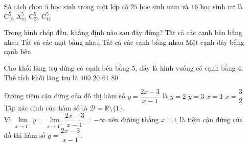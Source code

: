 \begin{ex}%
	Số cách chọn $5$ học sinh trong một lớp có $25$ học sinh nam và $16$ học sinh nữ là
	\choice
	 {$\mathrm{C}_{16}^{5}$}
	 {$\mathrm{A}_{41}^{5}$}
	 {$\mathrm{C}_{25}^{5}$}
	 {\True $\mathrm{C}_{41}^{5}$}
\end{ex}


\begin{ex}%
	Trong hình chóp đều, khẳng định nào sau đây đúng?
	\choice
	 {\True Tất cả các cạnh bên bằng nhau}
	 {Tất cả các mặt bằng nhau}
	 {Tất cả các cạnh bằng nhau}
	 {Một cạnh đáy bằng cạnh bên}
\end{ex}


\begin{ex}%
	Cho khối lăng trụ đứng có cạnh bên bằng $5$, đáy là hình vuông có cạnh bằng $4.$ Thể tích khối lăng trụ là
	\choice
	 {$100$}
	 {$20$}
	 {$64$}
	 {\True $80$}
\end{ex}



\begin{ex}%
	Đường tiệm cận đứng của đồ thị hàm số $y=\dfrac{2x-3}{x-1}$ là
	\choice
	{$y=2$}
	{$y=3$}
	{\True $x=1$}
	{$x=\dfrac{3}{2}$}
	\loigiai
	{
		Tập xác định của hàm số là $\mathscr{D}=\mathbb{R}\setminus \{1\}$.\\
		Vì $\lim\limits_{x\to 1^+}y= \lim\limits_{x\to 1^+}\dfrac{2x-3}{x-1}=-\infty$ nên đường thẳng $x=1$ là tiệm cận đứng của đồ thị hàm số $y=\dfrac{2x-3}{x-1}$.
	}
\end{ex}

